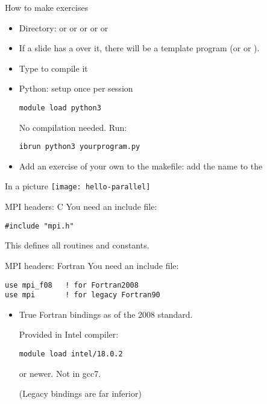 \begin{numberedframe}{How to make exercises}
  \begin{itemize}
  \item Directory:  or  or  or 
    or  or 
  \item If a slide has a  over it, there will be a
    template program  (or  or ).
  \item Type  to compile it
  \item Python: setup once per session
\begin{verbatim}
module load python3
\end{verbatim}
No compilation needed. Run:
\begin{verbatim}
ibrun python3 yourprogram.py
\end{verbatim}
\item Add an exercise of your own to the makefile: add the name to
    the 
  \end{itemize}
\end{numberedframe}

\begin{exerciseframe}[hello]
  
\end{exerciseframe}

\begin{numberedframe}{In a picture}
  \texttt{[image: hello-parallel]}
\end{numberedframe}


\begin{numberedframe}{MPI headers: C}
\label{sl:mpi-header-c}
You need an include file:
\begin{verbatim}
#include "mpi.h"
\end{verbatim}
This defines all routines and constants.
\end{numberedframe}

\begin{numberedframe}{MPI headers: Fortran}
\label{sl:mpi-header-f}
You need an include file:
\begin{verbatim}
use mpi_f08   ! for Fortran2008
use mpi       ! for legacy Fortran90
\end{verbatim}
\begin{itemize}
\item True Fortran bindings as of the 2008 standard.
\begin{tacc}
Provided in Intel compiler:
\begin{verbatim}
module load intel/18.0.2
\end{verbatim}
or newer. Not in gcc7.
\end{tacc}
(Legacy bindings are far inferior)
\end{itemize}
\end{numberedframe}

